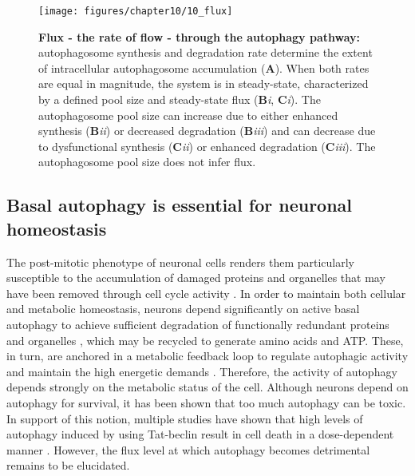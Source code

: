 \begin{figure}[h!]
  \center
  \texttt{[image: figures/chapter10/10\_flux]}
  \caption[Flux - the rate of flow - through the autophagy pathway]{\textbf{Flux - the rate of flow - through the autophagy pathway:} autophagosome synthesis and degradation rate determine the extent of intracellular autophagosome accumulation (\textbf{A}). When both rates are equal in magnitude, the system is in steady-state, characterized by a defined pool size and steady-state flux (\textbf{B}\textit{i}, \textbf{C}\textit{i}). The autophagosome pool size can increase due to either enhanced synthesis (\textbf{B}\textit{ii}) or decreased degradation (\textbf{B}\textit{iii}) and can decrease due to dysfunctional synthesis (\textbf{C}\textit{ii}) or enhanced degradation (\textbf{C}\textit{iii}). The autophagosome pool size does not infer flux. }
  \label{fig:10_flux}
\end{figure}

\subsection{Basal autophagy is essential for neuronal homeostasis}
The post-mitotic phenotype of neuronal cells renders them particularly susceptible to the accumulation of damaged proteins and organelles that may have been removed through cell cycle activity \citep{Liang2014,Tan2014}. In order to maintain both cellular and metabolic homeostasis, neurons depend significantly on active basal autophagy to achieve sufficient degradation of functionally redundant proteins and organelles \citep{Meijer2009}, which may be recycled to generate amino acids and ATP. These, in turn, are anchored in a metabolic feedback loop to regulate autophagic activity and maintain the high energetic demands \citep{Loos2013}. Therefore, the activity of autophagy depends strongly on the metabolic status of the cell. Although neurons depend on autophagy for survival, it has been shown that too much autophagy can be toxic. In support of this notion, multiple studies have shown that high levels of autophagy induced by using Tat-beclin result in cell death in a dose-dependent manner \citep{Liu2013,Liu2015}. However, the flux level at which autophagy becomes detrimental remains to be elucidated. 

